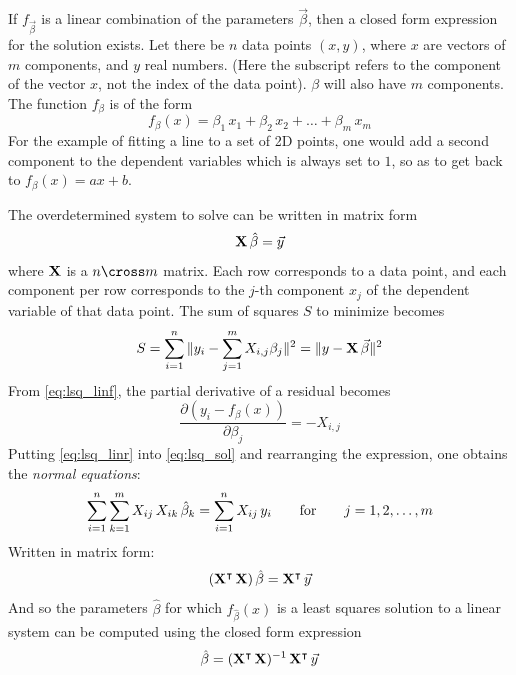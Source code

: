 If $f_{\vec{\beta}}$ is a linear combination of the parameters $\vec{\beta}$, then a closed form expression for the solution exists. Let there be $n$ data points $(x, y)$, where $x$ are vectors of $m$ components, and $y$ real numbers. (Here the subscript refers to the component of the vector $x$, not the index of the data point). $\beta$ will also have $m$ components. The function $f_{\beta}$ is of the form
\begin{equation} \label{eq:lsq_linf}
f_{\beta}(x) = \beta_1 \, x_1 + \beta_2 \, x_2 + \dots + \beta_m \, x_m
\end{equation}
For the example of fitting a line to a set of 2D points, one would add a second component to the dependent variables which is always set to $1$, so as to get back to $f_{\beta}(x) = ax + b$.

The overdetermined system to solve can be written in matrix form
\begin{equation}
\mathbf{X} \, \hat{\beta} = \vec{y}
\end{equation}
where $\mathbf{X}$ is a $n \cross m$ matrix. Each row corresponds to a data point, and each component per row corresponds to the $j$-th component $x_j$ of the dependent variable of that data point. The sum of squares $S$ to minimize becomes
\begin{equation}
S = \sum_{i=1}^{n} \| y_i - \sum_{j=1}^{m} X_{i,j} \beta_{j} \|^2 = \| y - \mathbf{X} \, \vec{\beta} \|^2
\end{equation}
From \ref{eq:lsq_linf}, the partial derivative of a residual becomes
\begin{equation} \label{eq:lsq_linr}
\frac{\partial (y_i - f_{\beta}(x))}{\partial \beta_j} = - X_{i,j}
\end{equation}
Putting \ref{eq:lsq_linr} into \ref{eq:lsq_sol} and rearranging the expression, one obtains the \emph{normal equations}:
\begin{equation}
\sum_{i=1}^{n} \sum_{k=1}^{m} X_{ij} \, X_{ik} \, \hat{\beta}_k = \sum_{i=1}^{n} X_{ij} \, y_{i}
\hspace{7mm} \text{for} \hspace{7mm}
j = 1, 2, \dots, m
\end{equation}
Written in matrix form:
\begin{equation}
(\mathbf{X}^\intercal \, \mathbf{X}) \, \hat{\beta} = \mathbf{X}^\intercal \, \vec{y}
\end{equation}
And so the parameters $\hat{\beta}$ for which $f_{\hat{\beta}}(x)$ is a least squares solution to a linear system can be computed using the closed form expression
\begin{equation}
\hat{\beta} = (\mathbf{X}^\intercal \, \mathbf{X})^{-1} \, \mathbf{X}^\intercal \, \vec{y}
\end{equation}

